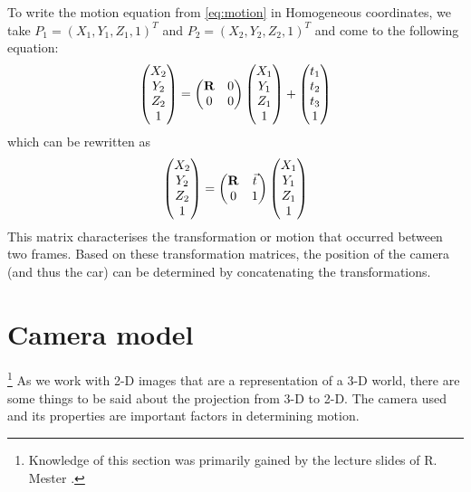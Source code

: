 To write the motion equation from \autoref{eq:motion} in Homogeneous coordinates, we take $P_1 = (X_1, Y_1, Z_1, 1)^T$ and $P_2 = (X_2, Y_2, Z_2, 1)^T$ and come to the following equation:
\begin{equation}
    \begin{pmatrix}
        X_2 \\ Y_2 \\ Z_2 \\ 1
    \end{pmatrix} = \begin{pmatrix}
        \mathbf{R} & 0 \\
        0 & 0
    \end{pmatrix} \begin{pmatrix}
        X_1 \\ Y_1 \\ Z_1 \\ 1
    \end{pmatrix} + \begin{pmatrix}
        t_1 \\ t_2 \\ t_3 \\ 1
    \end{pmatrix}
\end{equation}
which can be rewritten as
\begin{equation}
    \begin{pmatrix}
        X_2 \\ Y_2 \\ Z_2 \\ 1
    \end{pmatrix} = \begin{pmatrix}
        \mathbf{R} & \vec t \\
        0 & 1
    \end{pmatrix} \begin{pmatrix}
        X_1 \\ Y_1 \\ Z_1 \\ 1
    \end{pmatrix}
\end{equation}
This matrix characterises the transformation or motion that occurred between two frames. Based on these transformation matrices, the position of the camera (and thus the car) can be determined by concatenating the transformations.

\section{Camera model}\label{sec:cammodel}\footnote{Knowledge of this section was primarily gained by the lecture slides of R. Mester \cite{computer_vision}.}
As we work with 2-D images that are a representation of a 3-D world, there are some things to be said about the projection from 3-D to 2-D. The camera used and its properties are important factors in determining motion.

